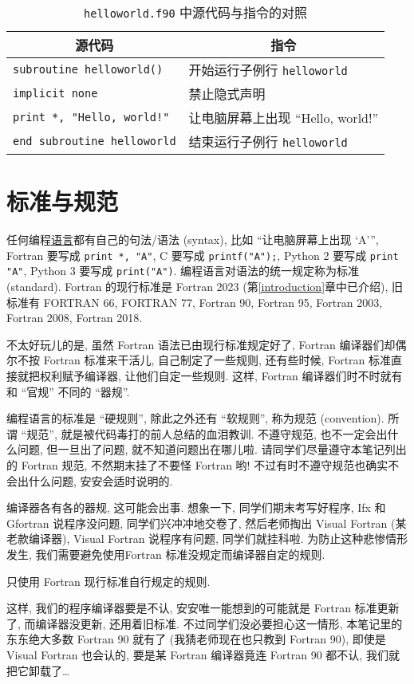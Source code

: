 \begin{table}[!htbp]
    \centering
    \begin{tabular}{|p{}|p{}|}
        \hline
        \multicolumn{1}{|c|}{源代码}&\multicolumn{1}{|c|}{指令}\\
        \hline
        \texttt{subroutine helloworld()}&开始运行子例行 \texttt{helloworld}\\
        \hline
        \texttt{implicit none}&禁止隐式声明\\
        \hline
        \texttt{print *, "Hello, world!"}&让电脑屏幕上出现 ``Hello, world!''\\
        \hline
        \texttt{end subroutine helloworld}&结束运行子例行 \texttt{helloworld}\\
        \hline
    \end{tabular}
    \caption{\texttt{helloworld.f90} 中源代码与指令的对照}\label{source_and_command_helloworld}
\end{table}

\section{标准与规范}

任何编程\uline{语言}都有自己的句法/语法 (syntax), 比如 ``让电脑屏幕上出现 `A'{}'', Fortran 要写成 \texttt{print *, "A"}, C 要写成 \texttt{printf("A");}, Python 2 要写成 \texttt{print "A"}, Python 3 要写成 \texttt{print("A")}. 编程语言对语法的统一规定称为标准 (standard). Fortran 的现行标准是 Fortran 2023 (第\ref{introduction}章中已介绍), 旧标准有 FORTRAN 66, FORTRAN 77, Fortran 90, Fortran 95, Fortran 2003, Fortran 2008, Fortran 2018.

不太好玩儿的是, 虽然 Fortran 语法已由现行标准规定好了, Fortran 编译器们却偶尔不按 Fortran 标准来干活儿, 自己制定了一些规则, 还有些时候, Fortran 标准直接就把权利赋予编译器, 让他们自定一些规则. 这样, Fortran 编译器们时不时就有和 ``官规'' 不同的 ``器规''.

编程语言的标准是 ``硬规则'', 除此之外还有 ``软规则'', 称为规范 (convention). 所谓 ``规范'', 就是被代码毒打的前人总结的血泪教训. 不遵守规范, 也不一定会出什么问题, 但一旦出了问题, 就不知道问题出在哪儿啦. 请同学们尽量遵守本笔记列出的 Fortran 规范, 不然期末挂了不要怪 Fortran 哟! 不过有时不遵守规范也确实不会出什么问题, 安安会适时说明的.

编译器各有各的器规, 这可能会出事. 想象一下, 同学们期末考写好程序, Ifx 和 Gfortran 说程序没问题, 同学们兴冲冲地交卷了, 然后老师掏出 Visual Fortran (某老款编译器), Visual Fortran 说程序有问题, 同学们就挂科啦. 为防止这种悲惨情形发生, 我们需要避免使用Fortran 标准没规定而编译器自定的规则.
\begin{convention}
    只使用 Fortran 现行标准自行规定的规则.
\end{convention}
这样, 我们的程序编译器要是不认, 安安唯一能想到的可能就是 Fortran 标准更新了, 而编译器没更新, 还用着旧标准. 不过同学们没必要担心这一情形, 本笔记里的东东绝大多数 Fortran 90 就有了 (我猜老师现在也只教到 Fortran 90), 即使是 Visual Fortran 也会认的, 要是某 Fortran 编译器竟连 Fortran 90 都不认, 我们就把它卸载了\dots{}

